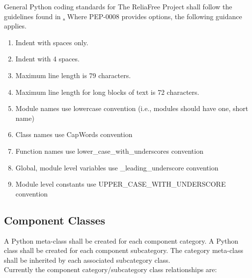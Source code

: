 \documentclass[11pt, 12pt, twoside, onecolumn]{article}
\begin{document}
\noindent General Python coding standards for The ReliaFree Project shall follow the guidelines found in \href{http://www.python.org/dev/peps/pep-0008/ PEP-0008}.  Where PEP-0008 provides options, the following guidance applies.

\begin{enumerate}
	\item Indent with spaces only.
	\item Indent with 4 spaces.
	\item Maximum line length is 79 characters.
	\item Maximum line length for long blocks of text is 72 characters.
	\item Module names use lowercase convention (i.e., modules should have one, short name)
	\item Class names use CapWords convention
	\item Function names use lower\_case\_with\_underscores convention
	\item Global, module level variables use \_leading\_underscore convention
	\item Module level constants use UPPER\_CASE\_WITH\_UNDERSCORE convention
\end{enumerate}

\subsection{\bf \large Component Classes}

\noindent A Python meta-class shall be created for each component category.  A Python class shall be created for each component subcategory.  The category meta-class shall be inherited by each associated subcategory class. \\

\noindent Currently the component category/subcategory class relationships are: \\
\end{document}

